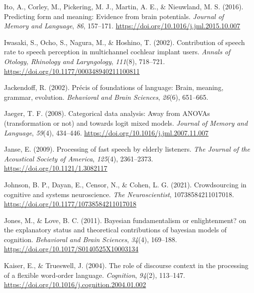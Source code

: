 \documentclass[a4paper, nobind]{templates/ociamthesis}
\newlength{\cslhangindent}
\newenvironment{CSLReferences}[2] %
 {%
  \setlength{\parindent}{0pt}
  \ifodd #1
  \let\oldpar\par
  \def\par{\hangindent=\cslhangindent\oldpar}
  \fi
  \setlength{\parskip}{1mm}
  \setlength{\baselineskip}{6mm}
 }%
 {}
\begin{document}
\begin{CSLReferences}{1}{0}
\leavevmode{}%
Ito, A., Corley, M., Pickering, M. J., Martin, A. E., \& Nieuwland, M. S. (2016). {Predicting form and meaning: Evidence from brain potentials}. \emph{Journal of Memory and Language}, \emph{86}, 157--171. \url{https://doi.org/10.1016/j.jml.2015.10.007}

\leavevmode{}%
Iwasaki, S., Ocho, S., Nagura, M., \& Hoshino, T. (2002). {Contribution of speech rate to speech perception in multichannel cochlear implant users}. \emph{Annals of Otology, Rhinology and Laryngology}, \emph{111}(8), 718--721. \url{https://doi.org/10.1177/000348940211100811}

\leavevmode{}%
Jackendoff, R. (2002). Pr{é}cis of foundations of language: Brain, meaning, grammar, evolution. \emph{Behavioral and Brain Sciences}, \emph{26}(6), 651--665.

\leavevmode{}%
Jaeger, T. F. (2008). {Categorical data analysis: Away from ANOVAs (transformation or not) and towards logit mixed models}. \emph{Journal of Memory and Language}, \emph{59}(4), 434--446. \url{https://doi.org/10.1016/j.jml.2007.11.007}

\leavevmode{}%
Janse, E. (2009). {Processing of fast speech by elderly listeners}. \emph{The Journal of the Acoustical Society of America}, \emph{125}(4), 2361--2373. \url{https://doi.org/10.1121/1.3082117}

\leavevmode{}%
Johnson, B. P., Dayan, E., Censor, N., \& Cohen, L. G. (2021). {Crowdsourcing in cognitive and systems neuroscience}. \emph{The Neuroscientist}, 10738584211017018. \url{https://doi.org/10.1177/10738584211017018}

\leavevmode{}%
Jones, M., \& Love, B. C. (2011). {Bayesian fundamentalism or enlightenment? on the explanatory status and theoretical contributions of bayesian models of cognition}. \emph{Behavioral and Brain Sciences}, \emph{34}(4), 169--188. \url{https://doi.org/10.1017/S0140525X10003134}

\leavevmode{}%
Kaiser, E., \& Trueswell, J. (2004). The role of discourse context in the processing of a flexible word-order language. \emph{Cognition}, \emph{94}(2), 113--147. \url{https://doi.org/10.1016/j.cognition.2004.01.002}


\end{CSLReferences}
\end{document}
